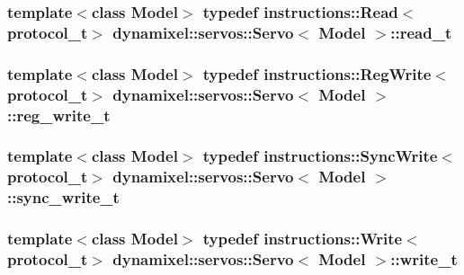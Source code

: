 \subsubsection[{\texorpdfstring{read\+\_\+t}{read_t}}]{\setlength{\rightskip}{0pt plus 5cm}template$<$class Model$>$ typedef {\bf instructions\+::\+Read}$<${\bf protocol\+\_\+t}$>$ {\bf dynamixel\+::servos\+::\+Servo}$<$ Model $>$\+::{\bf read\+\_\+t}}\hypertarget{classdynamixel_1_1servos_1_1_servo_a456a730b825adc0b7b295f567cf2947b}{}\label{classdynamixel_1_1servos_1_1_servo_a456a730b825adc0b7b295f567cf2947b}
\subsubsection[{\texorpdfstring{reg\+\_\+write\+\_\+t}{reg_write_t}}]{\setlength{\rightskip}{0pt plus 5cm}template$<$class Model$>$ typedef {\bf instructions\+::\+Reg\+Write}$<${\bf protocol\+\_\+t}$>$ {\bf dynamixel\+::servos\+::\+Servo}$<$ Model $>$\+::{\bf reg\+\_\+write\+\_\+t}}\hypertarget{classdynamixel_1_1servos_1_1_servo_adb8219ecc5a368a3222cf30cd17bb882}{}\label{classdynamixel_1_1servos_1_1_servo_adb8219ecc5a368a3222cf30cd17bb882}
\subsubsection[{\texorpdfstring{sync\+\_\+write\+\_\+t}{sync_write_t}}]{\setlength{\rightskip}{0pt plus 5cm}template$<$class Model$>$ typedef {\bf instructions\+::\+Sync\+Write}$<${\bf protocol\+\_\+t}$>$ {\bf dynamixel\+::servos\+::\+Servo}$<$ Model $>$\+::{\bf sync\+\_\+write\+\_\+t}}\hypertarget{classdynamixel_1_1servos_1_1_servo_aba1cb665a7f6abd9ba15f10f9264d9c8}{}\label{classdynamixel_1_1servos_1_1_servo_aba1cb665a7f6abd9ba15f10f9264d9c8}
\subsubsection[{\texorpdfstring{write\+\_\+t}{write_t}}]{\setlength{\rightskip}{0pt plus 5cm}template$<$class Model$>$ typedef {\bf instructions\+::\+Write}$<${\bf protocol\+\_\+t}$>$ {\bf dynamixel\+::servos\+::\+Servo}$<$ Model $>$\+::{\bf write\+\_\+t}}\hypertarget{classdynamixel_1_1servos_1_1_servo_a4d005c64809a7c1ddf3817ca55ef03c2}{}\label{classdynamixel_1_1servos_1_1_servo_a4d005c64809a7c1ddf3817ca55ef03c2}


